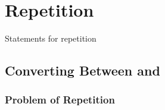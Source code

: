 \section{Repetition}
\label{sec:flow:repetition}


\begin{syntaxfloat}
  
  \caption{Statements for repetition}
  \label{syntax:flow:repetition}
\end{syntaxfloat}

\subsection{}



\subsection{}



\subsection{Converting Between  and }



\subsubsection{Problem of Repetition}



\subsection{}

